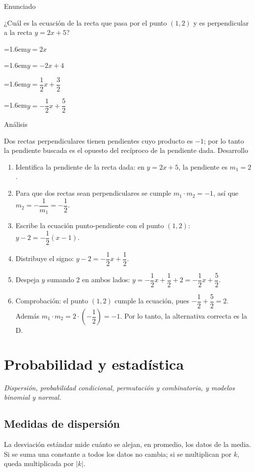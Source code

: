 \documentclass[10pt,a4paper,twocolumn]{article}
\newcommand{\alternativa}[2]{\par\noindent\hangindent=1.6em\hangafter=1\makebox[1.6em][l]{\tecla{#1}}#2\par}
\newcommand{\clave}[1]{\par\smallskip{\sffamily\footnotesize\color{esmeralda} Clave \teclaok{#1}}\par}
\begin{document}
\begin{ejemplo}
{\sffamily\footnotesize\color{zinc500} Enunciado}\par
¿Cuál es la ecuación de la recta que pasa por el punto $(1, 2)$ y es perpendicular a la recta $y = 2x + 5$?
\alternativa{A}{$y = 2x$}
\alternativa{B}{$y = -2x + 4$}
\alternativa{C}{$y = \dfrac{1}{2}x + \dfrac{3}{2}$}
\alternativa{D}{$y = -\dfrac{1}{2}x + \dfrac{5}{2}$}
\clave{D}
{\sffamily\footnotesize\color{zinc500} Análisis}\par Dos rectas perpendiculares tienen pendientes cuyo producto es $-1$; por lo tanto la pendiente buscada es el opuesto del recíproco de la pendiente dada.
{\sffamily\footnotesize\color{zinc500} Desarrollo}
\begin{enumerate}
  \item Identifica la pendiente de la recta dada: en $y = 2x + 5$, la pendiente es $m_1 = 2$.
  \item Para que dos rectas sean perpendiculares se cumple $m_1 \cdot m_2 = -1$, así que $m_2 = -\dfrac{1}{m_1} = -\dfrac{1}{2}$.
  \item Escribe la ecuación punto-pendiente con el punto $(1,2)$: $y - 2 = -\dfrac{1}{2}(x - 1)$.
  \item Distribuye el signo: $y - 2 = -\dfrac{1}{2}x + \dfrac{1}{2}$.
  \item Despeja $y$ sumando $2$ en ambos lados: $y = -\dfrac{1}{2}x + \dfrac{1}{2} + 2 = -\dfrac{1}{2}x + \dfrac{5}{2}$.
  \item Comprobación: el punto $(1,2)$ cumple la ecuación, pues $-\dfrac{1}{2} + \dfrac{5}{2} = 2$. Además $m_1\cdot m_2 = 2\cdot\left(-\dfrac{1}{2}\right) = -1$. Por lo tanto, la alternativa correcta es la D.
\end{enumerate}
\end{ejemplo}

\section{Probabilidad y estadística}

{\itshape\color{zinc700} Dispersión, probabilidad condicional, permutación y combinatoria, y modelos binomial y normal.}

\subsection{Medidas de dispersión}

La desviación estándar mide cuánto se alejan, en promedio, los datos de la media. Si se suma una constante a todos los datos no cambia; si se multiplican por $k$, queda multiplicada por $|k|$.
\end{document}
